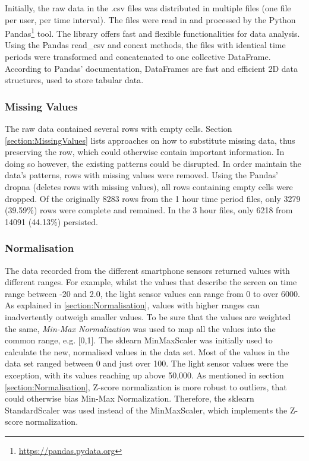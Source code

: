 Initially, the raw data in the .csv files was distributed in multiple files (one file per user, per time interval). The files were read in and processed by the Python Pandas\footnote{\url{https://pandas.pydata.org}} tool. The library offers fast and flexible functionalities for data analysis. Using the Pandas read\_csv and concat methods, the files with identical time periods were transformed and concatenated to one collective DataFrame. According to Pandas' documentation, DataFrames are fast and efficient 2D data structures, used to store tabular data. 


\subsubsection{Missing Values}
The raw data contained several rows with empty cells. Section \ref{section:MissingValues} lists approaches on how to substitute missing data, thus preserving the row, which could otherwise contain important information. In doing so however, the existing patterns could be disrupted. In order maintain the data's patterns, rows with missing values were removed. Using the Pandas' dropna (deletes rows with missing values), all rows containing empty cells were dropped. Of the originally 8283 rows from the 1 hour time period files, only 3279 (39.59\%) rows were complete and remained. In the 3 hour files, only 6218 from 14091 (44.13\%) persisted.

\subsubsection{Normalisation}
The data recorded from the different smartphone sensors returned values with different ranges. For example, whilst the values that describe the screen on time range between -20 and 2.0, the light sensor values can range from 0 to over 6000. As explained in \ref{section:Normalisation}, values with higher ranges can inadvertently outweigh smaller values. To be sure that the values are weighted the same, \textit{Min-Max Normalization} was used to map all the values into the common range, e.g. [0,1]. The sklearn MinMaxScaler was initially used to calculate the new, normalised values in the data set. Most of the values in the data set ranged between 0 and just over 100. The light sensor values were the exception, with its values reaching up above 50,000. As mentioned in section \ref{section:Normalisation}, Z-score normalization is more robust to outliers, that could otherwise bias Min-Max Normalization. Therefore, the sklearn StandardScaler was used instead of the MinMaxScaler, which implements the Z-score normalization.

